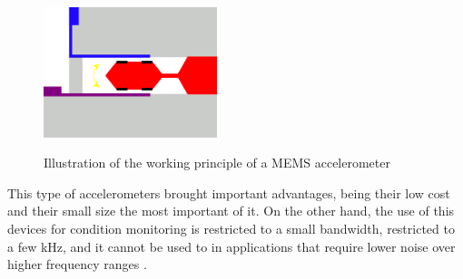  \begin{figure}[]
    \centering
    \includegraphics[width=0.45\textwidth]{Chapters/2CHP/Diagrams/memsacc.eps}
    \caption{Illustration of the working principle of a MEMS accelerometer}{}    
    \label{fig:wmemsacc}
\end{figure}
This type of accelerometers brought important advantages, being their low cost and their small size the most important of it. On the other hand, the use of this devices for condition monitoring is restricted to a small bandwidth, restricted to a few kHz, and it cannot be used to in applications that require lower noise over higher frequency ranges \cite{WhatYouNeed,HowAccelerometersWork2009}.

\clearpage
